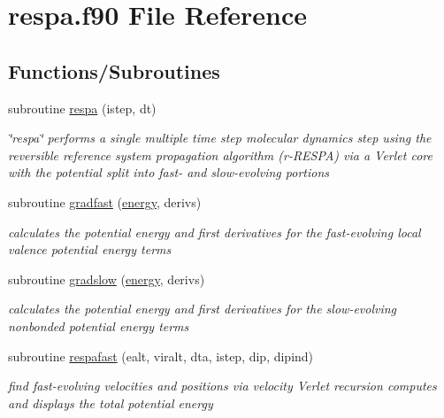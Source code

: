 \hypertarget{respa_8f90}{\section{respa.\-f90 File Reference}
\label{respa_8f90}
}
\subsection*{Functions/\-Subroutines}
\begin{DoxyCompactItemize}
\item 
subroutine \hyperlink{respa_8f90_a9973bf6f030df2aeeef2a2c0fd9079dc}{respa} (istep, dt)
\begin{DoxyCompactList}\small\item\em \char`\"{}respa\char`\"{} performs a single multiple time step molecular dynamics step using the reversible reference system propagation algorithm (r-\/\-R\-E\-S\-P\-A) via a Verlet core with the potential split into fast-\/ and slow-\/evolving portions \end{DoxyCompactList}\item 
subroutine \hyperlink{respa_8f90_a5ae7d0bb58a941bd4812ec2ad6ebf91c}{gradfast} (\hyperlink{energy_8f90_a1aa8c625eb0a3eea79ed1a8047707c94}{energy}, derivs)
\begin{DoxyCompactList}\small\item\em calculates the potential energy and first derivatives for the fast-\/evolving local valence potential energy terms \end{DoxyCompactList}\item 
subroutine \hyperlink{respa_8f90_a1636f8739527997ef2cb65bd0449ef35}{gradslow} (\hyperlink{energy_8f90_a1aa8c625eb0a3eea79ed1a8047707c94}{energy}, derivs)
\begin{DoxyCompactList}\small\item\em calculates the potential energy and first derivatives for the slow-\/evolving nonbonded potential energy terms \end{DoxyCompactList}\item 
subroutine \hyperlink{respa_8f90_ad5e596e0b5eb147c8a8112b41e2a0cf7}{respafast} (ealt, viralt, dta, istep, dip, dipind)
\begin{DoxyCompactList}\small\item\em find fast-\/evolving velocities and positions via velocity Verlet recursion computes and displays the total potential energy \end{DoxyCompactList}\end{DoxyCompactItemize}


